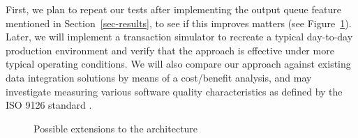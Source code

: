 \documentclass{CRPITStyle}
\begin{document}
First, we plan to repeat our tests after implementing the output queue
feature mentioned in Section~\ref{sec-results}, to see if this improves
matters (see Figure~\ref{fig-extended}). Later, we will implement a
transaction simulator to recreate a typical day-to-day production
environment and verify that the approach is effective under more typical
operating conditions. We will also compare our approach against existing
data integration solutions by means of a cost/benefit analysis, and may
investigate measuring various software quality characteristics as
defined by the ISO 9126 standard \cite{ISO-2001-9126-1}.


\begin{figure}[htb]
	\caption{Possible extensions to the architecture}
	\label{fig-extended}
\end{figure}
\end{document}
